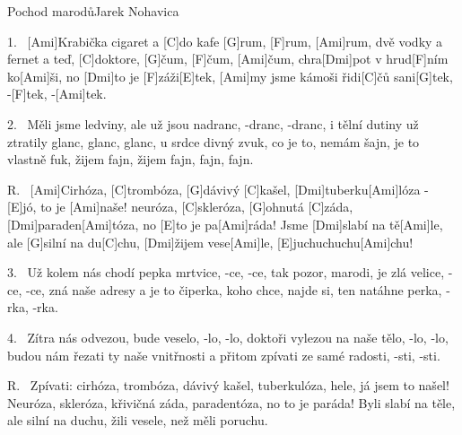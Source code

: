 \begin{song}{Pochod marodů}{Jarek Nohavica}

\begin{xverse}{1.~}
[Ami]Krabička cigaret a [C]do kafe [G]rum, [F]rum, [Ami]rum,
dvě vodky a fernet a teď, [C]doktore, [G]{čum}, [F]{čum}, [Ami]{čum},
chra[Dmi]pot v hrud[F]ním ko[Ami]{ši}, no [Dmi]to je [F]záži[E]tek,
[Ami]my jsme kámoši řidi[C]{čů} sani[G]tek, -[F]tek, -[Ami]tek.
\end{xverse}


\begin{xverse}{2.~}
Měli jsme ledviny, ale už jsou nadranc, -dranc, -dranc,
i tělní dutiny už ztratily glanc, glanc, glanc,
u srdce divný zvuk, co je to, nemám šajn,
je to vlastně fuk, žijem fajn, žijem fajn, fajn, fajn.
\end{xverse}


\begin{xverse}{R.~}
[Ami]Cirhóza, [C]trombóza, [G]dávivý [C]kašel,
[Dmi]tuberku[Ami]lóza - [E]jó, to je [Ami]naše!
neuróza, [C]skleróza, [G]ohnutá [C]záda,
[Dmi]paraden[Ami]tóza, no [E]to je pa[Ami]ráda!
Jsme [Dmi]slabí na tě[Ami]le, ale [G]silní na du[C]chu,
[Dmi]{ži}jem vese[Ami]le, [E]juchuchuchu[Ami]chu!
\end{xverse}


\begin{xverse}{3.~}
Už kolem nás chodí pepka mrtvice, -ce, -ce,
tak pozor, marodi, je zlá velice, -ce, -ce,
zná naše adresy a je to čiperka,
koho chce, najde si, ten natáhne perka, -rka, -rka.
\end{xverse}


\begin{xverse}{4.~}
Zítra nás odvezou, bude veselo, -lo, -lo,
doktoři vylezou na naše tělo, -lo, -lo,
budou nám řezati ty naše vnitřnosti
a přitom zpívati ze samé radosti, -sti, -sti.
\end{xverse}


\begin{xverse}{R.~}
Zpívati: cirhóza, trombóza, dávivý kašel,
tuberkulóza, hele, já jsem to našel!
Neuróza, skleróza, křivičná záda,
paradentóza, no to je paráda!
Byli slabí na těle, ale silní na duchu,
žili vesele, než měli poruchu.
\end{xverse}

\end{song}

